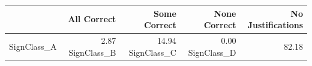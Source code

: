 \begin{tabular}{lrrrr}
\toprule
 & All Correct & Some Correct & None Correct & No Justifications \\
\midrule
SignClass_A & 2.87%
SignClass_B & 14.94%
SignClass_C & 0.00%
SignClass_D & 82.18%
\bottomrule
\end{tabular}
